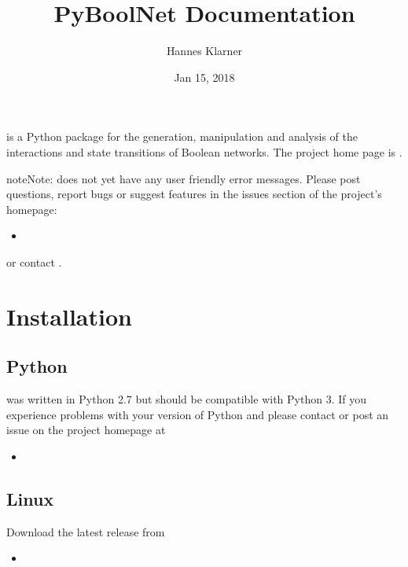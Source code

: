 \documentclass[letterpaper,10pt,english]{sphinxmanual}
\title{PyBoolNet Documentation}
\date{Jan 15, 2018}
\author{Hannes Klarner}
\begin{document}
\maketitle
\sphinxtableofcontents
{}\label{\detokenize{index::doc}}
 is a Python package for the generation, manipulation and analysis of the interactions and state transitions of Boolean networks.
The project home page is .

\begin{sphinxadmonition}{note}{Note:}
 does not yet have any user friendly error messages.
Please post questions, report bugs or suggest features in the issues section of the project’s homepage:
\begin{itemize}
\item {} 

\end{itemize}

or contact .
\end{sphinxadmonition}




\chapter{Installation}
\label{\detokenize{Installation:installation}}\label{\detokenize{Installation:id1}}\label{\detokenize{Installation::doc}}\label{\detokenize{Installation:installation-software}}

\section{Python}
\label{\detokenize{Installation:python}}
 was written in Python 2.7 but should be compatible with Python 3.
If you experience problems with your version of Python and  please contact  or
post an issue on the project homepage at
\begin{itemize}
\item {} 

\end{itemize}


\section{Linux}
\label{\detokenize{Installation:linux}}
Download the latest release from
\begin{itemize}
\item {} 

\end{itemize}
\end{document}
